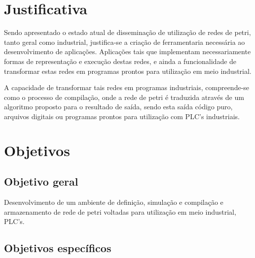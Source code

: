 \section{Justificativa}

Sendo apresentado o estado atual de disseminação de utilização de redes de petri, tanto geral como industrial, justifica-se a criação de ferramentaria necessária ao desenvolvimento de aplicações. Aplicações tais que implementam necessariamente formas de representação e execução destas redes, e ainda a funcionalidade de transformar estas redes em programas prontos para utilização em meio industrial.

A capacidade de transformar tais redes em programas industriais, compreende-se como o processo de compilação, onde a rede de petri é traduzida através de um algoritmo proposto para o resultado de saída, sendo esta saída código puro, arquivos digitais ou programas prontos para utilização com PLC's industriais.

\section{Objetivos}

\subsection{Objetivo geral}

Desenvolvimento de um ambiente de definição, simulação e compilação e armazenamento de rede de petri voltadas para utilização em meio industrial, PLC's.

\subsection{Objetivos específicos}

